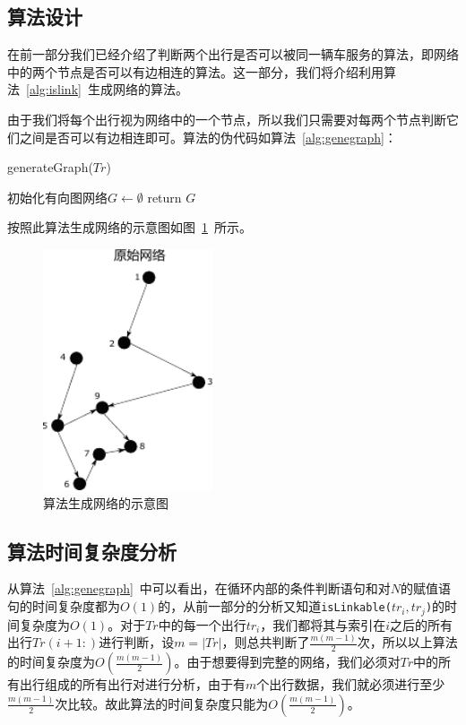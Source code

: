 \subsection{算法设计}
在前一部分我们已经介绍了判断两个出行是否可以被同一辆车服务的算法，即网络中的两个节点是否可以有边相连的算法。这一部分，我们将介绍利用算法~\ref{alg:islink}~生成网络的算法。
\par
由于我们将每个出行视为网络中的一个节点，所以我们只需要对每两个节点判断它们之间是否可以有边相连即可。算法的伪代码如算法~\ref{alg:genegraph}：
\begin{algorithm}[htbp]
\SetAlgoLined
{}
\caption{generateGraph($Tr$)}
\label{alg:genegraph}
\BlankLine
初始化有向图网络$G \leftarrow \emptyset$\;
return $G$\;
\end{algorithm}
\par
按照此算法生成网络的示意图如图~\ref{fig:net}~所示。
\begin{figure}
\centering
\includegraphics[width=5cm]{./figures/img/originalNetwork.pdf}
\caption{算法生成网络的示意图}
\label{fig:net}
\end{figure}
\subsection{算法时间复杂度分析}
从算法~\ref{alg:genegraph}~中可以看出，在循环内部的条件判断语句和对$N$的赋值语句的时间复杂度都为$O(1)$的，从前一部分的分析又知道\texttt{isLinkable($tr_i,tr_j$)}的时间复杂度为$O(1)$。对于$Tr$中的每一个出行$tr_i$，我们都将其与索引在$i$之后的所有出行$Tr(i+1:)$进行判断，设$m = |Tr|$，则总共判断了$\frac{m(m-1)}{2}$次，所以以上算法的时间复杂度为$O(\frac{m(m-1)}{2})$。由于想要得到完整的网络，我们必须对$Tr$中的所有出行组成的所有出行对进行分析，由于有$m$个出行数据，我们就必须进行至少$\frac{m(m-1)}{2}$次比较。故此算法的时间复杂度只能为$O(\frac{m(m-1)}{2})$。

